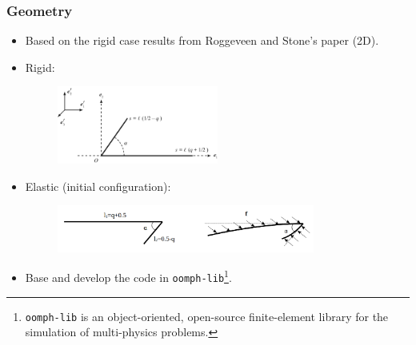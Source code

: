 \documentclass{beamer}
\begin{document}
\begin{frame}
	\frametitle{Geometry}
	\begin{overlayarea}{\textwidth}{\textheight}
		\vspace{-0.3cm}	
	\begin{itemize}
		\item  Based on the rigid case results from Roggeveen and Stone’s paper (2D).
		\item Rigid:\vspace{-0.3cm}
		\begin{figure}[htb]
			\begin{center}
				\includegraphics[width=0.5\textwidth]{plots/stone2.png}
			\end{center}
		\end{figure}
		\item Elastic (initial configuration):
		\begin{figure}[htb]
			\begin{center}
				\includegraphics[width=0.8\textwidth]{plots/geometry.png}
			\end{center}
		\end{figure}\vspace{-0.2cm}
	\item Base and develop the code in \texttt{oomph-lib}\footnote{\texttt{oomph-lib} is an object-oriented, open-source finite-element library for the simulation of multi-physics problems.}.
	\end{itemize}
	\end{overlayarea}
\end{frame}
\end{document}
